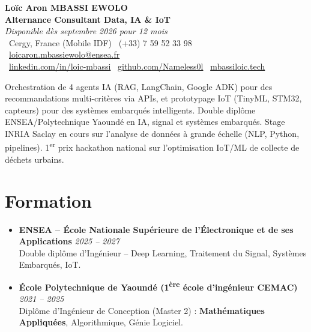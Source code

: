 \documentclass[a4paper,11pt]{article}
\begin{document}
\begin{center}
    {\Large \textbf{Loïc Aron MBASSI EWOLO}} \\ \vspace{4pt}
    \textbf{\large Alternance Consultant Data, IA \& IoT} \\
    \textit{\small Disponible dès septembre 2026 pour 12 mois} \\ \vspace{4pt}
    \small
    \faMapMarker\ Cergy, France (Mobile IDF) \quad
    \faPhone\ (+33) 7 59 52 33 98 \quad
    {\color{primary}\faEnvelope\ \href{mailto:loicaron.mbassiewolo@ensea.fr}{loicaron.mbassiewolo@ensea.fr}} \\ \vspace{2pt}
    {\color{primary}\faLinkedin\ \href{https://www.linkedin.com/in/loic-mbassi/}{linkedin.com/in/loic-mbassi}} \quad
    {\color{primary}\faGithub\ \href{https://github.com/Nameless0l}{github.com/Nameless0l}} \quad
    {\color{primary}\faGlobe\ \href{https://mbassiloic.tech}{mbassiloic.tech}}
\end{center}

\vspace{-6pt}

\noindent\small{Orchestration de 4 agents IA (RAG, LangChain, Google ADK) pour des recommandations multi-critères via APIs, et prototypage IoT (TinyML, STM32, capteurs) pour des systèmes embarqués intelligents. Double diplôme ENSEA/Polytechnique Yaoundé en IA, signal et systèmes embarqués. Stage INRIA Saclay en cours sur l'analyse de données à grande échelle (NLP, Python, pipelines). 1\textsuperscript{er} prix hackathon national sur l'optimisation IoT/ML de collecte de déchets urbains.}

\section{Formation}
\begin{itemize}[leftmargin=*, label=\tiny$\bullet$, nosep]
    \item \textbf{ENSEA -- École Nationale Supérieure de l'Électronique et de ses Applications} \hfill \textit{2025 -- 2027} \\
    \small{Double diplôme d'Ingénieur -- Deep Learning, Traitement du Signal, Systèmes Embarqués, IoT.}
    \item \textbf{École Polytechnique de Yaoundé (1\textsuperscript{ère} école d'ingénieur CEMAC)} \hfill \textit{2021 -- 2025} \\
    \small{Diplôme d'Ingénieur de Conception (Master 2) : \textbf{Mathématiques Appliquées}, Algorithmique, Génie Logiciel.}
\end{itemize}
\end{document}
